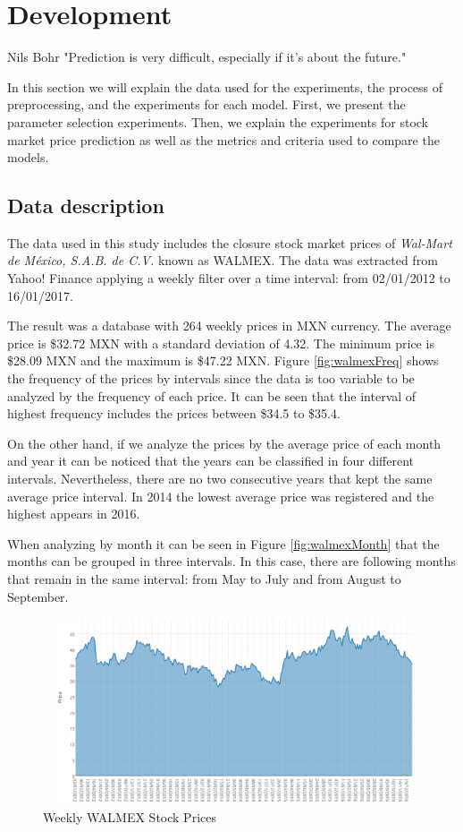 \chapter{Development}
\label{ch:dev}

\begin{chapterquote}{Nils Bohr}
	"Prediction is very difficult, especially if it's about the future."
\end{chapterquote}
In this section we will explain the data used for the experiments, the process of preprocessing, and the experiments for each model. First, we present the parameter selection experiments. Then, we explain the experiments for stock market price prediction as well as the metrics and criteria used to compare the models.

\section{Data description}
The data used in this study includes the closure stock market prices of \textit{Wal-Mart de México, S.A.B. de C.V.} known as WALMEX. The data was extracted from Yahoo! Finance applying a weekly filter over a time interval: from 02/01/2012 to 16/01/2017.

The result was a database with 264 weekly prices in MXN currency. The average price is \$32.72 MXN with a standard deviation of 4.32. The minimum price is \$28.09 MXN and the maximum is \$47.22 MXN. Figure \ref{fig:walmexFreq} shows the frequency of the prices by intervals since the data is too variable to be analyzed by the frequency of each price. It can be seen that the interval of highest frequency includes the prices between \$34.5 to \$35.4. 

On the other hand, if we analyze the prices by the average price of each month and year it can be noticed that the years can be classified in four different intervals. Nevertheless, there are no two consecutive years that kept the same average price interval. In 2014 the lowest average price was registered and the highest appears in 2016.

When analyzing by month it can be seen in Figure \ref{fig:walmexMonth} that the months can be grouped in three intervals. In this case, there are following months that remain in the same interval: from May to July and from August to September. 

 
\begin{figure}
\center
\includegraphics[width=12.5cm,height=5.5cm]{Figures/wamexCompleto.PNG}
\caption{Weekly WALMEX Stock Prices}
\label{fig:walmexComp}
\end{figure}


